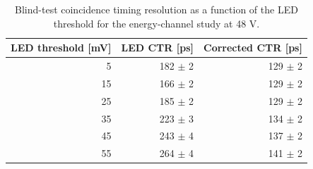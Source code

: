 \begin{table}[htbp]
\centering
\small
\begin{tabular}{rrr}
\toprule
LED threshold [mV] & LED CTR [ps] & Corrected CTR [ps] \\
\midrule
5 & 182 $\pm$ 2 & 129 $\pm$ 2 \\
15 & 166 $\pm$ 2 & 129 $\pm$ 2 \\
25 & 185 $\pm$ 2 & 129 $\pm$ 2 \\
35 & 223 $\pm$ 3 & 134 $\pm$ 2 \\
45 & 243 $\pm$ 4 & 137 $\pm$ 2 \\
55 & 264 $\pm$ 4 & 141 $\pm$ 2 \\
\bottomrule
\end{tabular}
\caption{Blind-test coincidence timing resolution as a function of the LED threshold for the energy-channel study at 48 V.}
\label{tab:uc-energy-threshold-scan}
\end{table}
